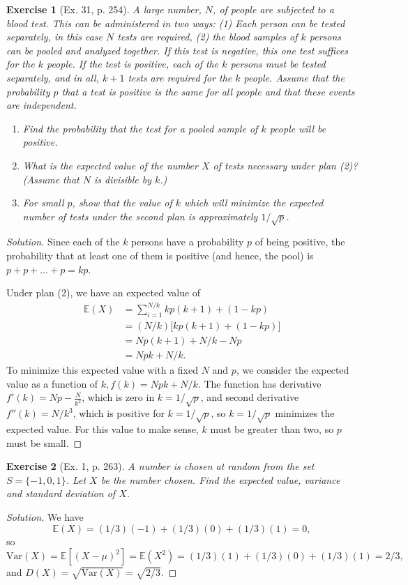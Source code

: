 \documentclass[letterpaper, 10 pt, conference]{article}
\newtheorem{ex}{Exercise}
\newcommand\E{\ensuremath{\mathbb{E}}}
\newcommand\V{\ensuremath{\mathrm{Var}}}
\begin{document}
\begin{ex}[Ex. 31, p. 254]
A large number, $N$, of people are subjected to a blood test. This can be administered in two ways: (1) Each person can be tested separately, in this case $N$ tests are required, (2) the blood samples of $k$ persons can be pooled and analyzed together. If this test is \textit{negative}, this one test suffices for the $k$ people. If the test is positive, each of the $k$ persons must be tested separately, and in all, $k+1$ tests are required for the $k$ people. Assume that the probability $p$ that a test is positive is the same for all people and that these events are independent.
\begin{enumerate}
	\item Find the probability that the test for a pooled sample of $k$ people will be positive. 
	\item What is the expected value of the number $X$ of tests necessary under plan (2)? (Assume that $N$ is divisible by $k$.)
	\item For small $p$, show that the value of $k$ which will minimize the expected number of tests under the second plan is approximately $1/\sqrt{p}$.
\end{enumerate}
\end{ex}
\begin{proof}[Solution]
Since each of the $k$ persons have a probability $p$ of being positive, the probability that at least one of them is positive (and hence, the pool) is $p + p + \dots + p = kp$.

Under plan (2), we have an expected value of
\begin{align}
	\E(X) &= \sum_{i = 1}^{N/k} kp(k+1) + (1-kp) \\
	&= (N/k) \lbrack kp (k+1) + (1-kp)\rbrack\\
	&= Np(k+1) + N/k - Np\\
	&= Npk + N/k.
\end{align}
To minimize this expected value with a fixed $N$ and $p$, we consider the expected value as a function of $k, f(k) = Npk + N/k$. The function has derivative $f'(k) = Np - \frac{N}{k^2}$, which is zero in $k=1/\sqrt{p}$, and second derivative $f''(k) = N/k^3$, which is positive for $k = 1/\sqrt{p}$, so $k = 1/\sqrt{p}$ minimizes the expected value. For this value to make sense, $k$ must be greater than two, so $p$ must be small.
\end{proof}

\begin{ex}[Ex. 1, p. 263]
	A number is chosen at random from the set $S = \lbrace -1, 0, 1\rbrace$. Let $X$ be the number chosen. Find the expected value, variance and standard deviation of $X$. 
\end{ex}
\begin{proof}[Solution]
	We have 
	\begin{equation}
	\E(X) = (1/3)(-1) + (1/3)(0) + (1/3)(1)= 0,
	\end{equation}
	so
	\begin{equation}
		\V(X) = \E[ (X-\mu)^2] = \E(X^2) = (1/3)(1) + (1/3)(0) + (1/3)(1) = 2/3,
	\end{equation} 
	and $D(X) = \sqrt{\V(X)} = \sqrt{2/3} $.
\end{proof}
\end{document}
